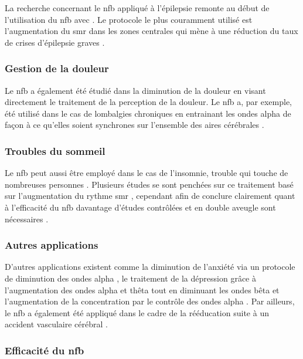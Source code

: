 La recherche concernant le \gls{nfb} appliqué à l'épilepsie remonte au début de l'utilisation du \gls{nfb} avec \citet{Sterman1974}. Le protocole le plus
couramment utilisé est l'augmentation du \gls{smr} dans les zones centrales qui mène à une réduction du taux de crises 
d'épilepsie graves \citep{Hughes2008, Walker2010, Tan2009, Sterman2010}.

\subsubsection{Gestion de la douleur}

Le \gls{nfb} a également été étudié dans la diminution de la douleur en visant directement le traitement de la perception de la douleur. Le \gls{nfb} a, par
exemple, été utilisé dans le cas de lombalgies chroniques en entrainant les ondes alpha de façon à ce qu'elles soient synchrones sur l'ensemble des aires 
cérébrales \citep{Mcknight2001, Thapa2018, Mayaud2019}.

\subsubsection{Troubles du sommeil}

Le \gls{nfb} peut aussi être employé dans le cas de l'insomnie, trouble qui touche de nombreuses personnes \citep{Marzbani2016}. Plusieurs études se sont penchées sur ce traitement
basé sur l'augmentation du rythme \gls{smr} \citep{Schabus2014, Schabus2017}, cependant afin de conclure clairement quant à l'efficacité du \gls{nfb} davantage 
d'études contrôlées et en double aveugle sont nécessaires \citep{Micoulaud2019sommeil}. 

\subsubsection{Autres applications}

D'autres applications existent comme la diminution de l'anxiété via un protocole de diminution des ondes alpha \citep{Budzynski2009}, le traitement de la dépression
grâce à l'augmentation des ondes alpha et thêta tout en diminuant les ondes bêta \citep{Hurt2014} et l'augmentation de la concentration par le contrôle des ondes
alpha \citep{Babiloni2008, Berka2010}. Par ailleurs, le \gls{nfb} a également été appliqué dans le cadre de la rééducation suite à un accident vasculaire cérébral \citep{Biasiucci2018,
Cervera2018}. 

\subsubsection{Efficacité du \gls{nfb}}
 
